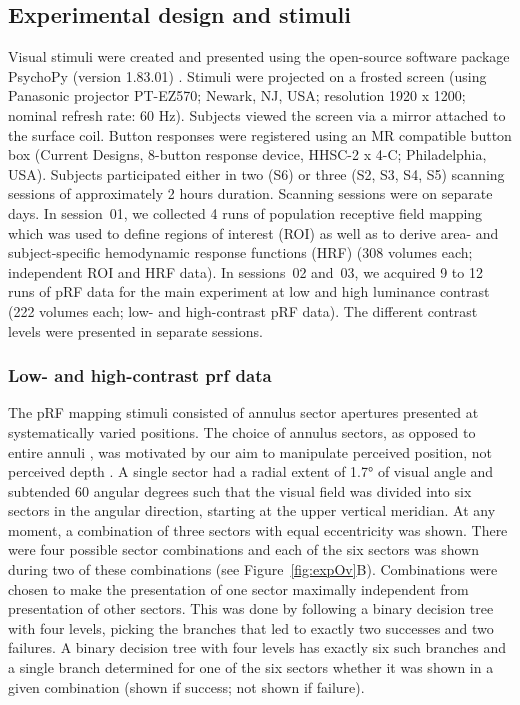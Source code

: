 \subsection{Experimental design and stimuli}
Visual stimuli were created and presented using the open-source software package PsychoPy (version 1.83.01) \parencite{Peirce2007,Peirce2008}. Stimuli were projected on a frosted screen (using Panasonic projector PT-EZ570; Newark, NJ, USA; resolution 1920 x 1200; nominal refresh rate: 60 Hz). Subjects viewed the screen via a mirror attached to the surface coil. Button responses were registered using an MR compatible button box (Current Designs, 8-button response device, HHSC-2 x 4-C; Philadelphia, USA). Subjects participated either in two (S6) or three (S2, S3, S4, S5) scanning sessions of approximately 2 hours duration. Scanning sessions were on separate days. In session~01, we collected 4 runs of population receptive field mapping which was used to define regions of interest (ROI) as well as to derive area- and subject-specific hemodynamic response functions (HRF) (308 volumes each; independent ROI and HRF data). In sessions~02 and~03, we acquired 9 to 12 runs of pRF data for the main experiment at low and high luminance contrast (222 volumes each; low- and high-contrast pRF data). The different contrast levels were presented in separate sessions.

\subsubsection{Low- and high-contrast prf data}
The pRF mapping stimuli consisted of annulus sector apertures presented at systematically varied positions. The choice of annulus sectors, as opposed to entire annuli \parencite{Liu2006}, was motivated by our aim to manipulate perceived position, not perceived depth \parencite{Edwards2003}. A single sector had a radial extent of 1.7° of visual angle and subtended 60 angular degrees such that the visual field was divided into six sectors in the angular direction, starting at the upper vertical meridian. At any moment, a combination of three sectors with equal eccentricity was shown. There were four possible sector combinations and each of the six sectors was shown during two of these combinations (see Figure~\ref{fig:expOv}B). Combinations were chosen to make the presentation of one sector maximally independent from presentation of other sectors. This was done by following a binary decision tree with four levels, picking the branches that led to exactly two successes and two failures. A binary decision tree with four levels has exactly six such branches and a single branch determined for one of the six sectors whether it was shown in a given combination (shown if success; not shown if failure).


